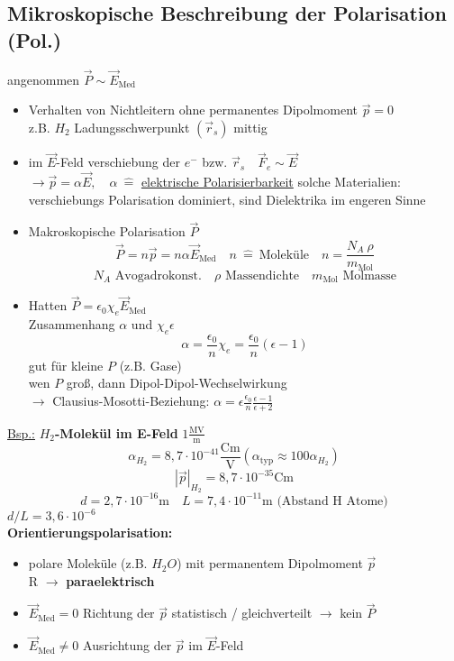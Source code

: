 \documentclass[titlepage,12pt,a4paper,ngerman]{report}
\newcommand{\tx}[1]{\textrm{#1}}
\begin{document}
\subsection{Mikroskopische Beschreibung der Polarisation (Pol.)}
angenommen $\vec{P} \sim \vec{E}_{\tx{Med}}$
\begin{itemize}
\item Verhalten von Nichtleitern ohne permanentes Dipolmoment $\vec{p} = 0$\\
z.B. $H_2$ Ladungsschwerpunkt $(\vec{r}_s)$ mittig 
\item im $\vec{E}$-Feld verschiebung der $e^-$ bzw. $\vec{r}_s \quad \vec{F}_e \sim \vec{E}$\\
$\rightarrow \vec{p} = \alpha \vec{E},\quad  \alpha\ \widehat{=}$ \underline{elektrische Polarisierbarkeit} solche Materialien: verschiebungs Polarisation dominiert, sind Dielektrika im engeren Sinne
\item Makroskopische Polarisation $\vec{P}$
$$\vec{P} = n \vec{p}  = n \alpha \vec{E}_{\tx{Med}} \quad n \ \widehat{ = }\  \tx{Moleküle} \quad  n = \frac{N_A\ \rho}{m_{\tx{Mol}}}$$
$$ N_A \tx{ Avogadrokonst.} \quad \rho \tx{ Massendichte} \quad m_{\tx{Mol}} \tx{ Molmasse}$$
\item Hatten $ \vec{P} = \epsilon_0 \chi_e \vec{E}_{\tx{Med}}$\\
Zusammenhang $\alpha$ und $\chi_e \epsilon$
$$\boxed{ \alpha = \frac{\epsilon_0}{n} \chi_e = \frac{\epsilon_0}{n} (\epsilon-1)
}$$
gut für kleine $P$ (z.B. Gase)\\
wen $P$ groß, dann Dipol-Dipol-Wechselwirkung\\
$\rightarrow$ Clausius-Mosotti-Beziehung: $\alpha = \epsilon \frac{\epsilon_0}{n} \frac{\epsilon-1}{\epsilon+2}$
\end{itemize}
\underline{Bsp.:} \textbf{ $H_2$-Molekül im E-Feld} $1\frac{\tx{MV}}{\tx{m}}$
$$\alpha_{H_2} = 8,7 \cdot 10^{-41} \frac{\tx{Cm}}{\tx{V}} (\alpha_{\tx{typ}} \approx 100 \alpha_{H_2})$$
$$|\vec{p}|_{H_2} = 8,7 \cdot 10^{-35} \tx{Cm}$$
$$d = 2,7\cdot 10^{-16} \tx{m} \quad L = 7,4 \cdot 10^{-11}\tx{m} \tx{ (Abstand H Atome)}$$
$d/L = 3,6\cdot 10^{-6}$\\[5pt]
\textbf{Orientierungspolarisation:}
\begin{itemize}
\item polare Moleküle (z.B. $H_2O$) mit permanentem Dipolmoment $\vec{p}$\\R
$\rightarrow $ \textbf{paraelektrisch}
\item$\vec{E}_{\tx{Med}} = 0 $ Richtung der $ \vec{p}$ statistisch / gleichverteilt $\rightarrow$ kein $\vec{P}$
\item $\vec{E}_{\tx{Med}} \neq 0$ Ausrichtung der $\vec{p}$ im $\vec{E}$-Feld
\end{itemize}
\end{document}
